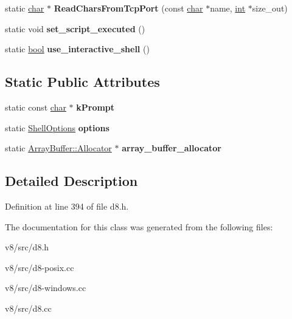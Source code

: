 \begin{DoxyCompactItemize}
\item 
\mbox{\label{classv8_1_1Shell_ac0c979ef9a81aa48cdc313b61eaa5fdc}} 
static \mbox{\hyperlink{classchar}{char}} $\ast$ {\bfseries Read\+Chars\+From\+Tcp\+Port} (const \mbox{\hyperlink{classchar}{char}} $\ast$name, \mbox{\hyperlink{classint}{int}} $\ast$size\+\_\+out)
\item 
\mbox{\label{classv8_1_1Shell_ac35ffcdb759c89431f9efaef22e8321d}} 
static void {\bfseries set\+\_\+script\+\_\+executed} ()
\item 
\mbox{\label{classv8_1_1Shell_a8b2c0e4d8ba33edbdd5bfff327180dda}} 
static \mbox{\hyperlink{classbool}{bool}} {\bfseries use\+\_\+interactive\+\_\+shell} ()
\end{DoxyCompactItemize}
\subsection*{Static Public Attributes}
\begin{DoxyCompactItemize}
\item 
\mbox{\label{classv8_1_1Shell_acf6e5f3411221607708dec0b3700a7c2}} 
static const \mbox{\hyperlink{classchar}{char}} $\ast$ {\bfseries k\+Prompt}
\item 
\mbox{\label{classv8_1_1Shell_aedbe06af26de0fe7e4618cac0ce45790}} 
static \mbox{\hyperlink{classv8_1_1ShellOptions}{Shell\+Options}} {\bfseries options}
\item 
\mbox{\label{classv8_1_1Shell_ad706b940496e9cccf4807a21424c7cc3}} 
static \mbox{\hyperlink{classv8_1_1ArrayBuffer_1_1Allocator}{Array\+Buffer\+::\+Allocator}} $\ast$ {\bfseries array\+\_\+buffer\+\_\+allocator}
\end{DoxyCompactItemize}


\subsection{Detailed Description}


Definition at line 394 of file d8.\+h.



The documentation for this class was generated from the following files\+:\begin{DoxyCompactItemize}
\item 
v8/src/d8.\+h\item 
v8/src/d8-\/posix.\+cc\item 
v8/src/d8-\/windows.\+cc\item 
v8/src/d8.\+cc\end{DoxyCompactItemize}
